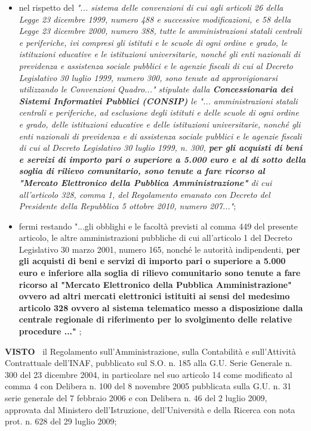 \documentclass[a4paper,12pt]{letter}
\begin{document}
\begin{itemize}
    
\item nel rispetto del \textit{"... sistema delle convenzioni di cui
agli articoli 26 della Legge 23 dicembre 1999, numero 488 e successive
modificazioni, e 58 della Legge 23 dicembre 2000, numero 388, tutte
le amministrazioni statali centrali e periferiche, ivi compresi gli
istituti e le scuole di ogni ordine e grado, le istituzioni educative e
le istituzioni universitarie, nonché gli enti nazionali di previdenza
e assistenza sociale pubblici e le agenzie fiscali di cui al Decreto
Legislativo 30 luglio 1999, numero 300, sono tenute ad approvigionarsi
utilizzando le Convenzioni Quadro..." stipulate dalla \textbf{Concessionaria
dei Sistemi Informativi Pubblici (CONSIP)} le "... amministrazioni
statali centrali e periferiche, ad esclusione degli istituti e delle
scuole di ogni ordine e grado, delle istituzioni educative e delle
istituzioni universitarie, nonché gli enti nazionali di previdenza e
di assistenza sociale pubblici e le agenzie fiscali di cui al Decreto
Legislativo 30 luglio 1999, n. 300, \textbf{per gli acquisti di beni e servizi
di importo pari o superiore a 5.000 euro e al di sotto della soglia di
rilievo comunitario, sono tenute a fare ricorso al "Mercato Elettronico
della Pubblica Amministrazione"} di cui all’articolo 328, comma 1,
del Regolamento emanato con Decreto del Presidente della Repubblica 5
ottobre 2010, numero 207..."};

\item fermi restando "...gli obblighi e le facoltà previsti al
comma 449 del presente articolo, le altre amministrazioni pubbliche di
cui all’articolo 1 del Decreto Legislativo 30 marzo 2001, numero 165,
nonché le autorità indipendenti, \textbf{per gli acquisti di beni e servizi di
importo pari o superiore a 5.000 euro e inferiore alla soglia di rilievo
comunitario sono tenute a fare ricorso al "Mercato Elettronico della
Pubblica Amministrazione" ovvero ad altri mercati elettronici istituiti
ai sensi del medesimo articolo 328 ovvero al sistema telematico messo a
disposizione dalla centrale regionale di riferimento per lo svolgimento
delle relative procedure ..."} ;

\end{itemize}

\textbf{VISTO~}	il Regolamento sull’Amministrazione, sulla Contabilità
e sull’Attività Contrattuale dell’INAF, pubblicato sul S.O. n. 185
alla G.U. Serie Generale n. 300 del 23 dicembre 2004, in particolare
nel suo articolo 14 come modificato al comma 4 con Delibera n. 100
del 8 novembre 2005 pubblicata sulla G.U. n. 31 serie generale del
7 febbraio 2006 e con Delibera n. 46 del 2 luglio 2009, approvata dal
Ministero dell’Istruzione, dell’Università e della Ricerca con nota
prot. n. 628 del 29 luglio 2009;
\end{document}
